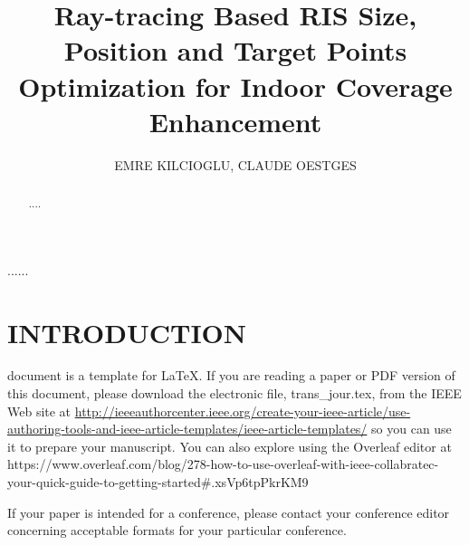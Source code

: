 \documentclass{IEEEoj}
\begin{document}

\title{Ray-tracing Based RIS Size, Position and Target Points Optimization for Indoor Coverage Enhancement}

\author{EMRE KILCIOGLU, CLAUDE OESTGES}

\begin{abstract}
....
\end{abstract}

\begin{IEEEkeywords}
......
\end{IEEEkeywords}


\maketitle

\section{INTRODUCTION}
 document is a template for \LaTeX. If you are 
reading a paper or PDF version of this document, please download the 
electronic file, trans\_jour.tex, from the IEEE Web site at \underline
{http://ieeeauthorcenter.ieee.org/create-your-ieee-article/}\break\underline{use-authoring-tools-and-ieee-article-templates/ieee-article-}\break\underline{templates/} so you can use it to prepare your manuscript.
You can also explore using the Overleaf editor at 
{https://www.overleaf.com/blog/278-how-to-use-overleaf-with-ieee-collabratec-your-quick-guide-to-getting-started\break\#.xsVp6tpPkrKM9}

If your paper is intended for a conference, please contact your conference 
editor concerning acceptable formats for your particular 
conference.
\end{document}
